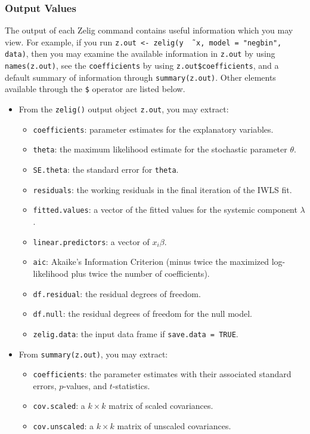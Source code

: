 \subsubsection{Output Values}

The output of each Zelig command contains useful information which you
may view.  For example, if you run \texttt{z.out <- zelig(y \~\,
  x, model = "negbin", data)}, then you may examine the available
information in \texttt{z.out} by using \texttt{names(z.out)},
see the {\tt coefficients} by using {\tt z.out\$coefficients}, and
a default summary of information through \texttt{summary(z.out)}.
Other elements available through the {\tt \$} operator are listed
below.

\begin{itemize}
\item From the {\tt zelig()} output object {\tt z.out}, you may extract:
   \begin{itemize}
   \item {\tt coefficients}: parameter estimates for the explanatory
     variables.
   \item {\tt theta}: the maximum likelihood estimate for the
     stochastic parameter $\theta$.  
   \item {\tt SE.theta}: the standard error for {\tt theta}.  
   \item {\tt residuals}: the working residuals in the final iteration
     of the IWLS fit.
   \item {\tt fitted.values}: a vector of the fitted values for the systemic
     component $\lambda$.  
   \item {\tt linear.predictors}: a vector of $x_{i} \beta$.  
   \item {\tt aic}: Akaike's Information Criterion (minus twice the
     maximized log-likelihood plus twice the number of coefficients).
   \item {\tt df.residual}: the residual degrees of freedom.
   \item {\tt df.null}: the residual degrees of freedom for the null
     model.
   \item {\tt zelig.data}: the input data frame if {\tt save.data = TRUE}.  
   \end{itemize}

\item From {\tt summary(z.out)}, you may extract: 
   \begin{itemize}
   \item {\tt coefficients}: the parameter estimates with their
     associated standard errors, $p$-values, and $t$-statistics.
   \item{\tt cov.scaled}: a $k \times k$ matrix of scaled covariances.
   \item{\tt cov.unscaled}: a $k \times k$ matrix of unscaled
     covariances.  
   \end{itemize}


\end{itemize}
